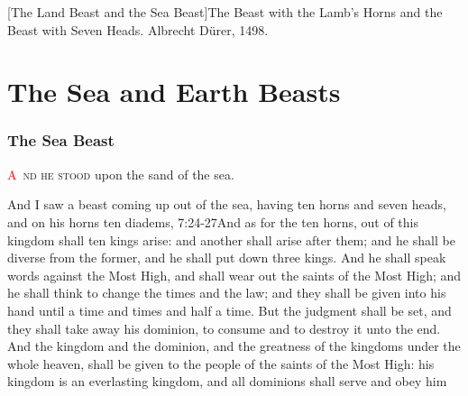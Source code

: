[The Land Beast and the Sea Beast]{The Beast with the Lamb's Horns and the Beast with Seven Heads. Albrecht Dürer, 1498.}

\chapter{The Sea and Earth Beasts}
\subsection*{The Sea Beast}
\lettrine[lines=3, slope=0.5em]{\textcolor{red}{A}}{\ nd he stood} upon the sand of the sea.

\zz And I saw a beast coming up out of the sea, having ten horns and seven heads, and on his horns ten diadems,%
					   {7:24-27}{And as for the ten horns, out of this kingdom shall ten kings arise: and another shall arise after them; and he shall be diverse from the former, and he shall put down three kings. And he shall speak words against the Most High, and shall wear out the saints of the Most High; and he shall think to change the times and the law; and they shall be given into his hand until a time and times and half a time. But the judgment shall be set, and they shall take away his dominion, to consume and to destroy it unto the end. And the kingdom and the dominion, and the greatness of the kingdoms under the whole heaven, shall be given to the people of the saints of the Most High: his kingdom is an everlasting kingdom, and all dominions shall serve and obey him}
